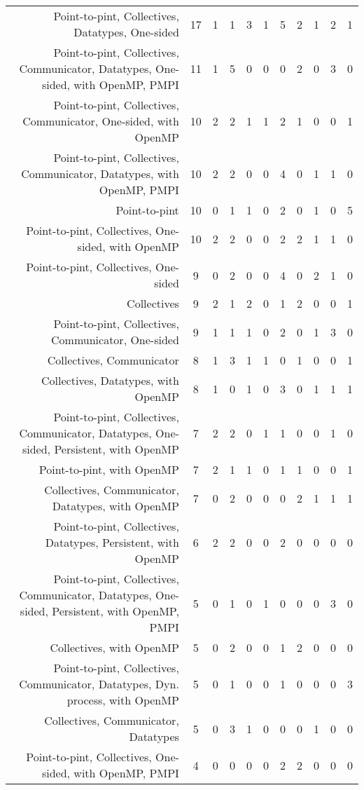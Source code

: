 {\begin{landscape}
\begin{longtable}[htb]{r|c|c|c|c|c|c|c|c|c|c}
{Point-to-pint, Collectives, Datatypes, One-sided} & 17 & 1 & 1 & 3 & 1 & 5 & 2 & 1 & 2 & 1 \\%
{Point-to-pint, Collectives, Communicator, Datatypes, One-sided, with OpenMP, PMPI} & 11 & 1 & 5 & 0 & 0 & 0 & 2 & 0 & 3 & 0 \\%
{Point-to-pint, Collectives, Communicator, One-sided, with OpenMP} & 10 & 2 & 2 & 1 & 1 & 2 & 1 & 0 & 0 & 1 \\%
{Point-to-pint, Collectives, Communicator, Datatypes, with OpenMP, PMPI} & 10 & 2 & 2 & 0 & 0 & 4 & 0 & 1 & 1 & 0 \\%
{Point-to-pint} & 10 & 0 & 1 & 1 & 0 & 2 & 0 & 1 & 0 & 5 \\%
{Point-to-pint, Collectives, One-sided, with OpenMP} & 10 & 2 & 2 & 0 & 0 & 2 & 2 & 1 & 1 & 0 \\%
{Point-to-pint, Collectives, One-sided} & 9 & 0 & 2 & 0 & 0 & 4 & 0 & 2 & 1 & 0 \\%
{Collectives} & 9 & 2 & 1 & 2 & 0 & 1 & 2 & 0 & 0 & 1 \\%
{Point-to-pint, Collectives, Communicator, One-sided} & 9 & 1 & 1 & 1 & 0 & 2 & 0 & 1 & 3 & 0 \\%
{Collectives, Communicator} & 8 & 1 & 3 & 1 & 1 & 0 & 1 & 0 & 0 & 1 \\%
{Collectives, Datatypes, with OpenMP} & 8 & 1 & 0 & 1 & 0 & 3 & 0 & 1 & 1 & 1 \\%
{Point-to-pint, Collectives, Communicator, Datatypes, One-sided, Persistent, with OpenMP} & 7 & 2 & 2 & 0 & 1 & 1 & 0 & 0 & 1 & 0 \\%
{Point-to-pint, with OpenMP} & 7 & 2 & 1 & 1 & 0 & 1 & 1 & 0 & 0 & 1 \\%
{Collectives, Communicator, Datatypes, with OpenMP} & 7 & 0 & 2 & 0 & 0 & 0 & 2 & 1 & 1 & 1 \\%
{Point-to-pint, Collectives, Datatypes, Persistent, with OpenMP} & 6 & 2 & 2 & 0 & 0 & 2 & 0 & 0 & 0 & 0 \\%
{Point-to-pint, Collectives, Communicator, Datatypes, One-sided, Persistent, with OpenMP, PMPI} & 5 & 0 & 1 & 0 & 1 & 0 & 0 & 0 & 3 & 0 \\%
{Collectives, with OpenMP} & 5 & 0 & 2 & 0 & 0 & 1 & 2 & 0 & 0 & 0 \\%
{Point-to-pint, Collectives, Communicator, Datatypes, Dyn. process, with OpenMP} & 5 & 0 & 1 & 0 & 0 & 1 & 0 & 0 & 0 & 3 \\%
{Collectives, Communicator, Datatypes} & 5 & 0 & 3 & 1 & 0 & 0 & 0 & 1 & 0 & 0 \\%
{Point-to-pint, Collectives, One-sided, with OpenMP, PMPI} & 4 & 0 & 0 & 0 & 0 & 2 & 2 & 0 & 0 & 0 \\%

\end{longtable}
\end{landscape}}
